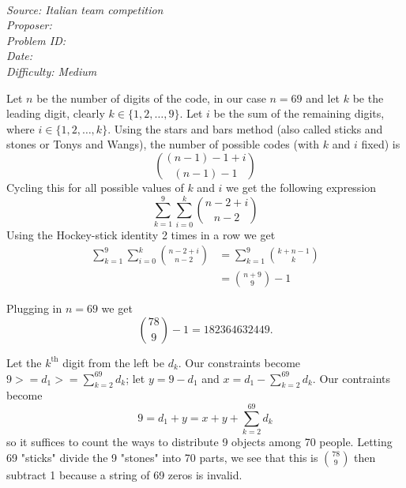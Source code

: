 \SSbreak\\
\emph{Source: Italian team competition}\\
\emph{Proposer: \Phobo}\\ %
\emph{Problem ID:}\\
\emph{Date: }\\
\emph{Difficulty: Medium}\\
\SSbreak

\bigskip

\begin{solution}\hfil\medskip

Let $n$ be the number of digits of the code, in our case $n=69$ and let $k$ be the leading digit, clearly $k\in\{1,2,\dots,9\}$. Let $i$ be the sum of the remaining digits, where $i\in\{1,2,\dots,k\}$. Using the stars and bars method (also called sticks and stones or Tonys and Wangs), the number of possible codes (with $k$ and $i$ fixed) is $$\binom{(n-1)-1+i}{(n-1)-1}$$ Cycling this for all possible values of $k$ and $i$ we get the following expression $$\sum_{k=1}^{9}\sum_{i=0}^{k}\binom{n-2+i}{n-2}$$ Using the Hockey-stick identity 2 times in a row we get 
\begin{align*}
    \sum_{k=1}^{9}\sum_{i=0}^{k}\binom{n-2+i}{n-2}&=\sum_{k=1}^{9}\binom{k+n-1}{k} \\
    &=\binom{n+9}{9}-1
\end{align*}

Plugging in $n = 69$ we get $$\binom{78}{9} - 1 = \boxed{182364632449}.$$
	
\end{solution}\bigskip

\begin{solution}\hfil\medskip

	Let the $k^\text{th}$ digit from the left be $d_k$. Our constraints become $9 >= d_1 >= \sum_{k = 2}^{69} d_k$; let $y = 9 - d_1$ and $x = d_1 - \sum_{k = 2}^{69}d_k$.
	Our contraints become $$9 = d_1 + y = x + y + \sum_{k = 2}^{69} d_k$$ so it suffices to count the ways to distribute 9 objects among 70 people.
	Letting 69 "sticks" divide the 9 "stones" into 70 parts, we see that this is $\binom{78}{9}$ then subtract 1 because a string of 69 zeros is invalid. 
\end{solution}